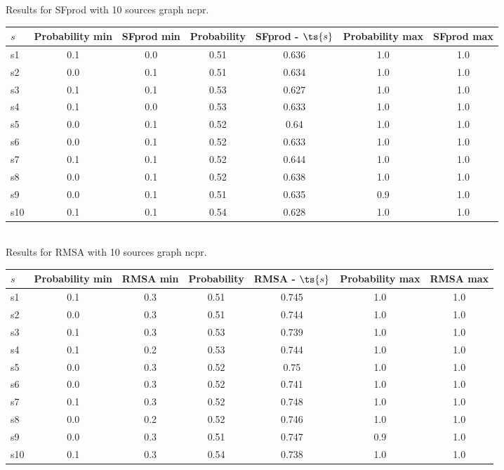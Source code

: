 \documentclass{article}
\begin{document}
\noindent Results for SFprod with 10 sources graph ncpr.

\noindent\begin{tabular}{|l|c|c|c|c|c|c|}
\hline
$s$& Probability min & SFprod min & Probability & SFprod - $\ts{s}$ & Probability max & SFprod max\\
\hline
s1 &0.1 & 0.0 & 0.51 & 0.636 & 1.0 & 1.0\\
\hline
s2 &0.0 & 0.1 & 0.51 & 0.634 & 1.0 & 1.0\\
\hline
s3 &0.1 & 0.1 & 0.53 & 0.627 & 1.0 & 1.0\\
\hline
s4 &0.1 & 0.0 & 0.53 & 0.633 & 1.0 & 1.0\\
\hline
s5 &0.0 & 0.1 & 0.52 & 0.64 & 1.0 & 1.0\\
\hline
s6 &0.0 & 0.1 & 0.52 & 0.633 & 1.0 & 1.0\\
\hline
s7 &0.1 & 0.1 & 0.52 & 0.644 & 1.0 & 1.0\\
\hline
s8 &0.0 & 0.1 & 0.52 & 0.638 & 1.0 & 1.0\\
\hline
s9 &0.0 & 0.1 & 0.51 & 0.635 & 0.9 & 1.0\\
\hline
s10 &0.1 & 0.1 & 0.54 & 0.628 & 1.0 & 1.0\\
\hline
\end{tabular}\\

\noindent Results for RMSA with 10 sources graph ncpr.

\noindent\begin{tabular}{|l|c|c|c|c|c|c|}
\hline
$s$& Probability min & RMSA min & Probability & RMSA - $\ts{s}$ & Probability max & RMSA max\\
\hline
s1 &0.1 & 0.3 & 0.51 & 0.745 & 1.0 & 1.0\\
\hline
s2 &0.0 & 0.3 & 0.51 & 0.744 & 1.0 & 1.0\\
\hline
s3 &0.1 & 0.3 & 0.53 & 0.739 & 1.0 & 1.0\\
\hline
s4 &0.1 & 0.2 & 0.53 & 0.744 & 1.0 & 1.0\\
\hline
s5 &0.0 & 0.3 & 0.52 & 0.75 & 1.0 & 1.0\\
\hline
s6 &0.0 & 0.3 & 0.52 & 0.741 & 1.0 & 1.0\\
\hline
s7 &0.1 & 0.3 & 0.52 & 0.748 & 1.0 & 1.0\\
\hline
s8 &0.0 & 0.2 & 0.52 & 0.746 & 1.0 & 1.0\\
\hline
s9 &0.0 & 0.3 & 0.51 & 0.747 & 0.9 & 1.0\\
\hline
s10 &0.1 & 0.3 & 0.54 & 0.738 & 1.0 & 1.0\\
\hline
\end{tabular}\\
\end{document}

